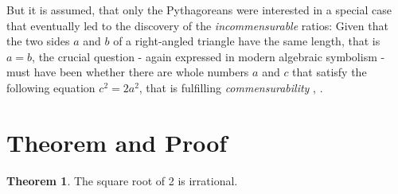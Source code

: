 \documentclass[11pt]{amsart}
\theoremstyle{definition}
\newtheorem{theorem}{Theorem}
\begin{document}
But it is assumed, that only the Pythagoreans were interested in a special case that eventually led to the discovery of the \emph{incommensurable} ratios: Given that the two sides \(a\) and \(b\) of a right-angled triangle have the same length, that is \(a = b\), the crucial question - again expressed in modern algebraic symbolism - must have been whether there are whole numbers \(a\) and \(c\) that satisfy the following equation \(c^{2} = 2a^{2}\), that is fulfilling \emph{commensurability} \cite[6-7]{stillwellStoryProofLogic2022}, \cite[58]{courantWhatMathematicsElementary1996}.
\section{Theorem and Proof}
\begin{theorem}\label{0.0}
    The square root of 2 is irrational.
\end{theorem}
\end{document}
